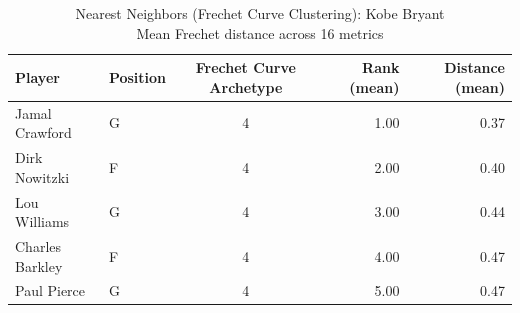 \begin{table}[t]
\caption*{
{\fontsize{20}{25} Nearest Neighbors (Frechet Curve Clustering): Kobe Bryant\fontsize{12}{15}\selectfont } \\ 
{\fontsize{14}{17}\selectfont  Mean Frechet distance across 16 metrics\fontsize{12}{15}\selectfont }
} 
\fontsize{12.0pt}{14.0pt}\selectfont
\begin{tabular*}{\linewidth}{@{\extracolsep{\fill}}llcrr}
\toprule
Player & Position & Frechet Curve Archetype & Rank (mean) & Distance (mean) \\ 
\midrule\addlinespace[2.5pt]
Jamal Crawford & G & 4 & 1.00 & 0.37 \\ 
Dirk Nowitzki & F & 4 & 2.00 & 0.40 \\ 
Lou Williams & G & 4 & 3.00 & 0.44 \\ 
Charles Barkley & F & 4 & 4.00 & 0.47 \\ 
Paul Pierce & G & 4 & 5.00 & 0.47 \\ 
\bottomrule
\end{tabular*}
\end{table}

